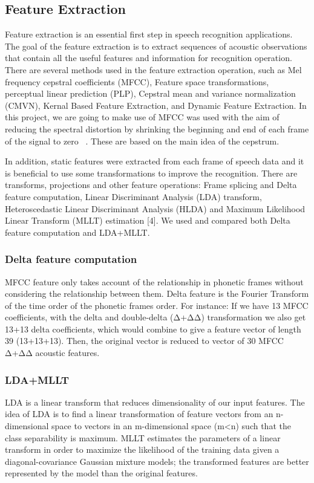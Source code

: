 \documentclass[conference]{IEEEtran}
\begin{document}
\subsection{Feature Extraction}
\label{subsec:FeatureExtraction}
Feature extraction is an essential first step in speech recognition applications. The goal of the feature extraction is to extract sequences of acoustic observations that contain all the useful features and information for recognition operation. There are several methods used in the feature extraction operation, such as Mel frequency cepstral coefficients (MFCC), Feature space transformations, perceptual linear prediction (PLP), Cepstral mean and variance normalization (CMVN), Kernal Based Feature Extraction, and Dynamic Feature Extraction. In this project, we are going to make use of MFCC was used with the aim of reducing the spectral distortion by shrinking the beginning and end of each frame of the signal to zero ~\cite{gmm}. These are based on the main idea of the cepstrum.

In addition, static features were extracted from each frame of speech data and it is beneficial to use some transformations to improve the recognition. There are transforms, projections and other feature operations: Frame splicing and Delta feature computation, Linear Discriminant Analysis (LDA) transform, Heteroscedastic Linear Discriminant Analysis (HLDA) and Maximum Likelihood Linear Transform (MLLT) estimation [4]. We used and compared both Delta feature computation and LDA+MLLT.

\subsubsection{Delta feature computation}
\label{subsec:Deltafeaturecomputation.}
MFCC feature only takes account of the relationship in phonetic frames without considering the relationship between them. Delta feature is the Fourier Transform of the time order of the phonetic frames order. For instance: If we have 13 MFCC coefficients, with the delta and double-delta (Δ+ΔΔ) transformation we also get 13+13 delta coefficients, which would combine to give a feature vector of length 39 (13+13+13). Then, the original vector is reduced to vector of 30 MFCC Δ+ΔΔ acoustic features.

\subsubsection{LDA+MLLT}
\label{subsec:LDAMLLT}
LDA is a linear transform that reduces dimensionality of our input features. The idea of LDA is to find a linear transformation of feature vectors from an n-dimensional space to vectors in an m-dimensional space (m<n) such that the class separability is maximum. MLLT estimates the parameters of a linear transform in order to maximize the likelihood of the training data given a diagonal-covariance Gaussian mixture models; the transformed features are better represented by the model than the original features. 
\end{document}

